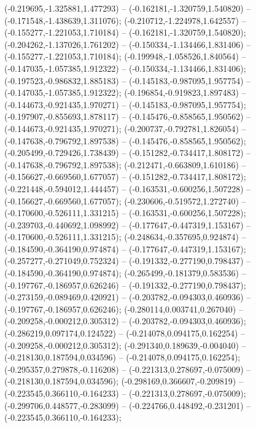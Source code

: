  (-0.219695,-1.325881,1.477293) -- (-0.162181,-1.320759,1.540820) -- (-0.171548,-1.438639,1.311076);
 (-0.210712,-1.224978,1.642557) -- (-0.155277,-1.221053,1.710184) -- (-0.162181,-1.320759,1.540820);
 (-0.204262,-1.137026,1.761202) -- (-0.150334,-1.134466,1.831406) -- (-0.155277,-1.221053,1.710184);
 (-0.199948,-1.058526,1.840564) -- (-0.147035,-1.057385,1.912322) -- (-0.150334,-1.134466,1.831406);
 (-0.197523,-0.986832,1.885183) -- (-0.145183,-0.987095,1.957754) -- (-0.147035,-1.057385,1.912322);
 (-0.196854,-0.919823,1.897483) -- (-0.144673,-0.921435,1.970271) -- (-0.145183,-0.987095,1.957754);
 (-0.197907,-0.855693,1.878117) -- (-0.145476,-0.858565,1.950562) -- (-0.144673,-0.921435,1.970271);
 (-0.200737,-0.792781,1.826054) -- (-0.147638,-0.796792,1.897538) -- (-0.145476,-0.858565,1.950562);
 (-0.205499,-0.729426,1.738439) -- (-0.151282,-0.734417,1.808172) -- (-0.147638,-0.796792,1.897538);
 (-0.212471,-0.663809,1.610186) -- (-0.156627,-0.669560,1.677057) -- (-0.151282,-0.734417,1.808172);
 (-0.221448,-0.594012,1.444457) -- (-0.163531,-0.600256,1.507228) -- (-0.156627,-0.669560,1.677057);
 (-0.230606,-0.519572,1.272740) -- (-0.170600,-0.526111,1.331215) -- (-0.163531,-0.600256,1.507228);
 (-0.239703,-0.440692,1.098992) -- (-0.177647,-0.447319,1.153167) -- (-0.170600,-0.526111,1.331215);
 (-0.248634,-0.357695,0.924874) -- (-0.184590,-0.364190,0.974874) -- (-0.177647,-0.447319,1.153167);
 (-0.257277,-0.271049,0.752324) -- (-0.191332,-0.277190,0.798437) -- (-0.184590,-0.364190,0.974874);
 (-0.265499,-0.181379,0.583536) -- (-0.197767,-0.186957,0.626246) -- (-0.191332,-0.277190,0.798437);
 (-0.273159,-0.089469,0.420921) -- (-0.203782,-0.094303,0.460936) -- (-0.197767,-0.186957,0.626246);
 (-0.280114,0.003741,0.267040) -- (-0.209258,-0.000212,0.305312) -- (-0.203782,-0.094303,0.460936);
 (-0.286219,0.097174,0.124522) -- (-0.214078,0.094175,0.162254) -- (-0.209258,-0.000212,0.305312);
 (-0.291340,0.189639,-0.004040) -- (-0.218130,0.187594,0.034596) -- (-0.214078,0.094175,0.162254);
 (-0.295357,0.279878,-0.116208) -- (-0.221313,0.278697,-0.075009) -- (-0.218130,0.187594,0.034596);
 (-0.298169,0.366607,-0.209819) -- (-0.223545,0.366110,-0.164233) -- (-0.221313,0.278697,-0.075009);
 (-0.299706,0.448577,-0.283099) -- (-0.224766,0.448492,-0.231201) -- (-0.223545,0.366110,-0.164233);
